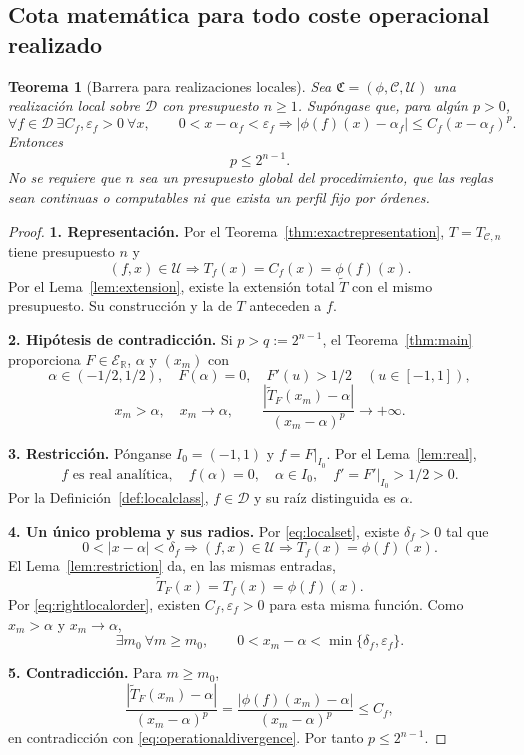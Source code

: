 \documentclass[11pt,a4paper]{article}
\numberwithin{equation}{section}
\newtheorem{theorem}{Teorema}[section]
\theoremstyle{definition}
\theoremstyle{remark}
\newcommand{\R}{\mathbb R}
\newcommand{\ER}{\mathcal E_{\R}}
\newcommand{\DD}{\mathcal D}
\newcommand{\paso}[1]{\par\smallskip\noindent\textbf{#1}\quad}
\begin{document}
\subsection{Cota matemática para todo coste operacional realizado}
\begin{theorem}[Barrera para realizaciones locales]\label{thm:operationalbarrier}\label{cor:KT}
Sea $\mathfrak C=(\phi,\mathscr C,\mathcal U)$ una realización local sobre $\DD$ con presupuesto $n\ge1$. Supóngase que, para algún $p>0$,
\begin{equation}\label{eq:rightlocalorder}
\forall f\in\DD\ \exists C_f,\varepsilon_f>0\ \forall x,\qquad
0<x-\alpha_f<\varepsilon_f\Longrightarrow
|\phi(f)(x)-\alpha_f|\le C_f(x-\alpha_f)^p.
\end{equation}
Entonces
\begin{equation}\label{eq:operationalbound}
p\le2^{n-1}.
\end{equation}
No se requiere que $n$ sea un presupuesto global del procedimiento, que las reglas sean continuas o computables ni que exista un perfil fijo por órdenes.
\end{theorem}
\begin{proof}
\paso{1. Representación.}
Por el Teorema~\ref{thm:exactrepresentation}, $T=T_{\mathscr C,n}$ tiene presupuesto $n$ y
\[
(f,x)\in\mathcal U\Longrightarrow T_f(x)=C_f(x)=\phi(f)(x).
\]
Por el Lema~\ref{lem:extension}, existe la extensión total $\widetilde T$ con el mismo presupuesto. Su construcción y la de $T$ anteceden a $f$.
\paso{2. Hipótesis de contradicción.}
Si $p>q:=2^{n-1}$, el Teorema~\ref{thm:main} proporciona $F\in\ER$, $\alpha$ y $(x_m)$ con
\[
\alpha\in(-1/2,1/2),\quad F(\alpha)=0,\quad F'(u)>1/2\quad(u\in[-1,1]),
\]
\begin{equation}\label{eq:operationaldivergence}
x_m>\alpha,\quad x_m\to\alpha,\qquad
\frac{|\widetilde T_F(x_m)-\alpha|}{(x_m-\alpha)^p}\longrightarrow+\infty.
\end{equation}
\paso{3. Restricción.}
Pónganse $I_0=(-1,1)$ y $f=F|_{I_0}$. Por el Lema~\ref{lem:real},
\[
f\text{ es real analítica},\quad f(\alpha)=0,\quad \alpha\in I_0,
\quad f'=F'|_{I_0}>1/2>0.
\]
Por la Definición~\ref{def:localclass}, $f\in\DD$ y su raíz distinguida es $\alpha$.
\paso{4. Un único problema y sus radios.}
Por \eqref{eq:localset}, existe $\delta_f>0$ tal que
\[
0<|x-\alpha|<\delta_f\Longrightarrow (f,x)\in\mathcal U
\Longrightarrow T_f(x)=\phi(f)(x).
\]
El Lema~\ref{lem:restriction} da, en las mismas entradas,
\[
\widetilde T_F(x)=T_f(x)=\phi(f)(x).
\]
Por \eqref{eq:rightlocalorder}, existen $C_f,\varepsilon_f>0$ para esta misma función. Como $x_m>\alpha$ y $x_m\to\alpha$,
\[
\exists m_0\ \forall m\ge m_0,\qquad
0<x_m-\alpha<\min\{\delta_f,\varepsilon_f\}.
\]
\paso{5. Contradicción.}
Para $m\ge m_0$,
\[
\frac{|\widetilde T_F(x_m)-\alpha|}{(x_m-\alpha)^p}
=\frac{|\phi(f)(x_m)-\alpha|}{(x_m-\alpha)^p}
\le C_f,
\]
en contradicción con \eqref{eq:operationaldivergence}. Por tanto $p\le2^{n-1}$.
\end{proof}
\end{document}
